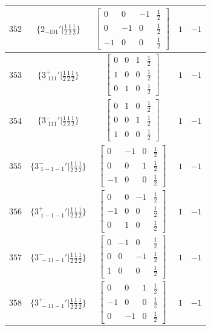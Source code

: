 \documentclass[fleqn,8pt]{jsarticle}
\begin{document}
\begin{longtable}{ccccc}
$ 352 $ & $ \{2{}_{-101}{}'|\frac{1}{2} \frac{1}{2} \frac{1}{2}\} $ & $ \begin{bmatrix} 0 & 0 & -1 & \frac{1}{2} \\ 0 & -1 & 0 & \frac{1}{2} \\ -1 & 0 & 0 & \frac{1}{2} \end{bmatrix} $ & $ 1 $ & $ -1 $ \\ \hline
$ 353 $ & $ \{3^{+}_{\,\,111}{}'|\frac{1}{2} \frac{1}{2} \frac{1}{2}\} $ & $ \begin{bmatrix} 0 & 0 & 1 & \frac{1}{2} \\ 1 & 0 & 0 & \frac{1}{2} \\ 0 & 1 & 0 & \frac{1}{2} \end{bmatrix} $ & $ 1 $ & $ -1 $ \\ \hline
$ 354 $ & $ \{3^{-}_{\,\,111}{}'|\frac{1}{2} \frac{1}{2} \frac{1}{2}\} $ & $ \begin{bmatrix} 0 & 1 & 0 & \frac{1}{2} \\ 0 & 0 & 1 & \frac{1}{2} \\ 1 & 0 & 0 & \frac{1}{2} \end{bmatrix} $ & $ 1 $ & $ -1 $ \\ \hline
$ 355 $ & $ \{3^{-}_{\,\,1-1-1}{}'|\frac{1}{2} \frac{1}{2} \frac{1}{2}\} $ & $ \begin{bmatrix} 0 & -1 & 0 & \frac{1}{2} \\ 0 & 0 & 1 & \frac{1}{2} \\ -1 & 0 & 0 & \frac{1}{2} \end{bmatrix} $ & $ 1 $ & $ -1 $ \\ \hline
$ 356 $ & $ \{3^{+}_{\,\,1-1-1}{}'|\frac{1}{2} \frac{1}{2} \frac{1}{2}\} $ & $ \begin{bmatrix} 0 & 0 & -1 & \frac{1}{2} \\ -1 & 0 & 0 & \frac{1}{2} \\ 0 & 1 & 0 & \frac{1}{2} \end{bmatrix} $ & $ 1 $ & $ -1 $ \\ \hline
$ 357 $ & $ \{3^{-}_{\,\,-11-1}{}'|\frac{1}{2} \frac{1}{2} \frac{1}{2}\} $ & $ \begin{bmatrix} 0 & -1 & 0 & \frac{1}{2} \\ 0 & 0 & -1 & \frac{1}{2} \\ 1 & 0 & 0 & \frac{1}{2} \end{bmatrix} $ & $ 1 $ & $ -1 $ \\ \hline
$ 358 $ & $ \{3^{+}_{\,\,-11-1}{}'|\frac{1}{2} \frac{1}{2} \frac{1}{2}\} $ & $ \begin{bmatrix} 0 & 0 & 1 & \frac{1}{2} \\ -1 & 0 & 0 & \frac{1}{2} \\ 0 & -1 & 0 & \frac{1}{2} \end{bmatrix} $ & $ 1 $ & $ -1 $ \\ \hline

\end{longtable}
\end{document}
